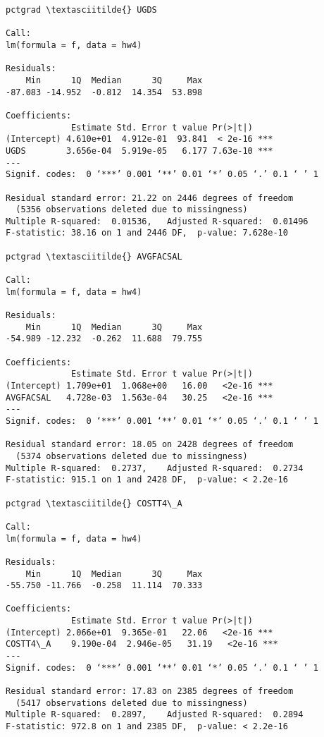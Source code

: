 \documentclass[11pt]{article}
\begin{document}
    \begin{Verbatim}[commandchars=\\\{\}]
pctgrad \textasciitilde{} UGDS

Call:
lm(formula = f, data = hw4)

Residuals:
    Min      1Q  Median      3Q     Max 
-87.083 -14.952  -0.812  14.354  53.898 

Coefficients:
             Estimate Std. Error t value Pr(>|t|)    
(Intercept) 4.610e+01  4.912e-01  93.841  < 2e-16 ***
UGDS        3.656e-04  5.919e-05   6.177 7.63e-10 ***
---
Signif. codes:  0 ‘***’ 0.001 ‘**’ 0.01 ‘*’ 0.05 ‘.’ 0.1 ‘ ’ 1

Residual standard error: 21.22 on 2446 degrees of freedom
  (5356 observations deleted due to missingness)
Multiple R-squared:  0.01536,	Adjusted R-squared:  0.01496 
F-statistic: 38.16 on 1 and 2446 DF,  p-value: 7.628e-10

pctgrad \textasciitilde{} AVGFACSAL

Call:
lm(formula = f, data = hw4)

Residuals:
    Min      1Q  Median      3Q     Max 
-54.989 -12.232  -0.262  11.688  79.755 

Coefficients:
             Estimate Std. Error t value Pr(>|t|)    
(Intercept) 1.709e+01  1.068e+00   16.00   <2e-16 ***
AVGFACSAL   4.728e-03  1.563e-04   30.25   <2e-16 ***
---
Signif. codes:  0 ‘***’ 0.001 ‘**’ 0.01 ‘*’ 0.05 ‘.’ 0.1 ‘ ’ 1

Residual standard error: 18.05 on 2428 degrees of freedom
  (5374 observations deleted due to missingness)
Multiple R-squared:  0.2737,	Adjusted R-squared:  0.2734 
F-statistic: 915.1 on 1 and 2428 DF,  p-value: < 2.2e-16

pctgrad \textasciitilde{} COSTT4\_A

Call:
lm(formula = f, data = hw4)

Residuals:
    Min      1Q  Median      3Q     Max 
-55.750 -11.766  -0.258  11.114  70.333 

Coefficients:
             Estimate Std. Error t value Pr(>|t|)    
(Intercept) 2.066e+01  9.365e-01   22.06   <2e-16 ***
COSTT4\_A    9.190e-04  2.946e-05   31.19   <2e-16 ***
---
Signif. codes:  0 ‘***’ 0.001 ‘**’ 0.01 ‘*’ 0.05 ‘.’ 0.1 ‘ ’ 1

Residual standard error: 17.83 on 2385 degrees of freedom
  (5417 observations deleted due to missingness)
Multiple R-squared:  0.2897,	Adjusted R-squared:  0.2894 
F-statistic: 972.8 on 1 and 2385 DF,  p-value: < 2.2e-16


\end{Verbatim}
\end{document}
